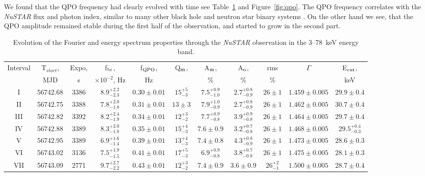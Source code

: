 \documentclass[a4paper,fleqn,usenatbib]{mnras}
\begin{document}
We found that the QPO frequency had clearly evolved with time see Table~\ref{tab:timing} and Figure~\ref{fig:qpo}.
The QPO frequency correlates with the {\it NuSTAR} flux and photon index, similar to many other black hole and neutron star binary systems \citep[see, e.g.,][]{vignarca03,2003A&A...407.1039P}.
On the other hand we see, that the QPO amplitude remained stable during the first half of the observation, and started to grow in the second part.

\begin{table}
\noindent
\centering
\caption{Evolution of the Fourier and energy spectrum properties through the {\it NuSTAR} observation in the 3--78~keV energy band.}
\label{tab:timing}
\centering
\begin{tabular}{|c|c|c|c|c|c|c|c|c|c|c|}
\hline\hline
Interval    & T$_{start}$,  & Expo,     & f$_{\rm br}$,                     & f$_{\rm QPO}$, & Q$_{\rm m}$,     & A$_{\rm m}$,  & A$_{\rm o}$,      & rms & $\Gamma$ & E$_{\rm cut}$, \\
            &  MJD          &  s        & $\times10^{-2}$, Hz               &  Hz            &   & \%            &  \%               &   \%       &          &  keV             \\
\hline
I           & 56742.68      & 3386      & $8.9_{-2.3}^{+2.2}$  & $0.30\pm0.01$ & $15_{-3}^{+5}$ & $7.5_{-1.0}^{+0.9}$ & $2.7_{-0.9}^{+0.8}$ & $26\pm1$ & $1.459\pm0.005$ & $29.9\pm0.4$ \\
II & 56742.75 & 3388 & $7.8_{-1.8}^{+2.0}$ & $0.31\pm0.01$ & $13\pm3$ & $7.9_{-0.9}^{+1.0}$ & $2.7_{-0.9}^{+0.8}$ & $26\pm1$ & $1.462\pm0.005$ & $30.7\pm0.4$ \\
III & 56742.82 & 3392 & $8.2_{-1.9}^{+2.4}$ & $0.34\pm0.01$ & $12_{-2}^{+3}$ & $7.7_{-0.8}^{+0.9}$ & $3.9_{-0.8}^{+0.9}$ & $26\pm1$ & $1.464\pm0.005$ & $29.7\pm0.4$ \\
IV & 56742.88 & 3389 & $8.3_{-1.8}^{+2.0}$ & $0.35\pm0.01$ & $15_{-3}^{+4}$ & $7.6\pm0.9$ & $3.2_{-0.8}^{+0.7}$ & $26\pm1$ & $1.468\pm0.005$ & $29.5_{-0.3}^{+0.4}$ \\
V & 56742.95 & 3389 & $6.9_{-1.4}^{+1.6}$ & $0.39\pm0.01$ & $13_{-3}^{+4}$ & $7.4\pm0.8$ & $4.3_{-0.9}^{+0.8}$ & $26\pm1$ & $1.473\pm0.005$ & $28.6\pm0.3$ \\
VI & 56743.02 & 3136 & $7.5_{-1.5}^{+1.9}$ & $0.41\pm0.01$ & $17_{-3}^{+5}$ & $6.9_{-0.8}^{+0.9}$ & $3.8_{-0.8}^{+0.7}$ & $26\pm1$ & $1.475\pm0.005$ & $28.1\pm0.3$ \\
VII & 56743.09 & 2771 & $9.7_{-2.2}^{+2.7}$ & $0.43\pm0.01$ & $12_{-2}^{+3}$ & $7.4\pm0.9$ & $3.6\pm0.9$ & $26_{-1}^{+2}$ & $1.500\pm0.005$ & $28.7\pm0.4$ \\

\end{tabular}
\end{table}
\end{document}
